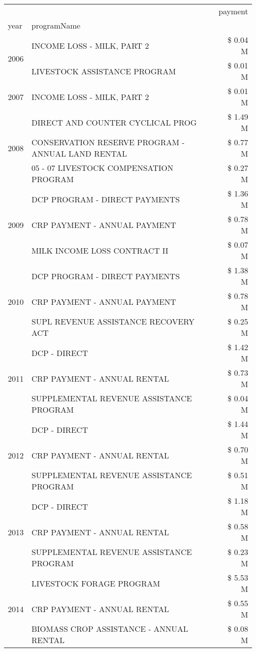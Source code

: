 \begin{tabular}{llr}
\toprule
 &  & payment \\
year & programName &  \\
\midrule
\multirow[t]{2}{*}{2006} & INCOME LOSS - MILK, PART 2 & \$ 0.04 M \\
 & LIVESTOCK ASSISTANCE PROGRAM & \$ 0.01 M \\
\cline{1-3}
2007 & INCOME LOSS - MILK, PART 2 & \$ 0.01 M \\
\cline{1-3}
\multirow[t]{3}{*}{2008} & DIRECT AND COUNTER CYCLICAL PROG & \$ 1.49 M \\
 & CONSERVATION RESERVE PROGRAM - ANNUAL LAND RENTAL & \$ 0.77 M \\
 & 05 - 07 LIVESTOCK COMPENSATION PROGRAM & \$ 0.27 M \\
\cline{1-3}
\multirow[t]{3}{*}{2009} & DCP PROGRAM - DIRECT PAYMENTS & \$ 1.36 M \\
 & CRP PAYMENT - ANNUAL PAYMENT & \$ 0.78 M \\
 & MILK INCOME LOSS CONTRACT II & \$ 0.07 M \\
\cline{1-3}
\multirow[t]{3}{*}{2010} & DCP PROGRAM - DIRECT PAYMENTS & \$ 1.38 M \\
 & CRP PAYMENT - ANNUAL PAYMENT & \$ 0.78 M \\
 & SUPL REVENUE ASSISTANCE RECOVERY ACT & \$ 0.25 M \\
\cline{1-3}
\multirow[t]{3}{*}{2011} & DCP - DIRECT & \$ 1.42 M \\
 & CRP PAYMENT - ANNUAL RENTAL & \$ 0.73 M \\
 & SUPPLEMENTAL REVENUE ASSISTANCE PROGRAM & \$ 0.04 M \\
\cline{1-3}
\multirow[t]{3}{*}{2012} & DCP - DIRECT & \$ 1.44 M \\
 & CRP PAYMENT - ANNUAL RENTAL & \$ 0.70 M \\
 & SUPPLEMENTAL REVENUE ASSISTANCE PROGRAM & \$ 0.51 M \\
\cline{1-3}
\multirow[t]{3}{*}{2013} & DCP - DIRECT & \$ 1.18 M \\
 & CRP PAYMENT - ANNUAL RENTAL & \$ 0.58 M \\
 & SUPPLEMENTAL REVENUE ASSISTANCE PROGRAM & \$ 0.23 M \\
\cline{1-3}
\multirow[t]{3}{*}{2014} & LIVESTOCK FORAGE PROGRAM & \$ 5.53 M \\
 & CRP PAYMENT - ANNUAL RENTAL & \$ 0.55 M \\
 & BIOMASS CROP ASSISTANCE - ANNUAL RENTAL & \$ 0.08 M \\

\end{tabular}
